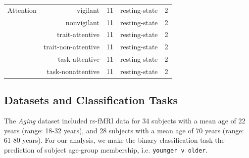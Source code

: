 \documentclass[12pt]{spieman}  %
\newcommand{\code}[1]{\small\texttt{#1}\normalsize}
\begin{document}
\begin{spacing}{2}
\begin{table}[h!]
\begin{tabular}{ l r c c c }
Attention&  vigilant           & 11     & resting-state       & 2 \\
        &  nonvigilant         & 11     & resting-state        & 2 \\
        &  trait-attentive     & 11    & resting-state        & 2 \\
        &  trait-non-attentive & 11    & resting-state        & 2 \\
        &  task-attentive     & 11     & resting-state        & 2 \\
        &  task-nonattentive  & 11     & resting-state        & 2 \\
\hline
\end{tabular}
\end{table}



\subsection{Datasets and Classification Tasks}


The \textit{Aging} dataset\cite{wahlheimIntrinsicFunctionalConnectivity2021}
included rs-fMRI data for 34 subjects with a mean age of 22 years (range: 18-32
years), and 28 subjects with a mean age of 70 years (range: 61-80 years). For
our analysis, we make the binary classification task the prediction of subject
age-group membership, i.e. \code{younger v older}.



\end{spacing}
\end{document}
